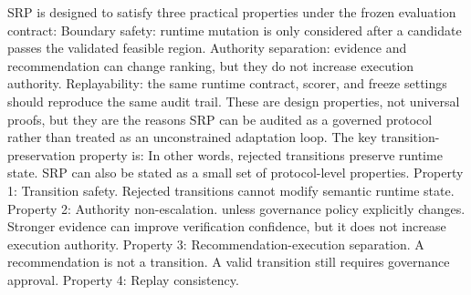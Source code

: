 {}SRP is designed to satisfy three practical properties under the frozen evaluation contract:\markdownRendererInterblockSeparator
{}\markdownRendererUlBeginTight
\markdownRendererUlItem Boundary safety: runtime mutation is only considered after a candidate passes the validated feasible region.\markdownRendererUlItemEnd 
\markdownRendererUlItem Authority separation: evidence and recommendation can change ranking, but they do not increase execution authority.\markdownRendererUlItemEnd 
\markdownRendererUlItem Replayability: the same runtime contract, scorer, and freeze settings should reproduce the same audit trail.\markdownRendererUlItemEnd 
\markdownRendererUlEndTight \markdownRendererInterblockSeparator
{}These are design properties, not universal proofs, but they are the reasons SRP can be audited as a governed protocol rather than treated as an unconstrained adaptation loop.\markdownRendererParagraphSeparator
{}The key transition-preservation property is:\markdownRendererInterblockSeparator
{}\markdownRendererInterblockSeparator
{}In other words, rejected transitions preserve runtime state.\markdownRendererInterblockSeparator
{}
\markdownRendererSectionEnd \markdownRendererSectionBegin
{}\markdownRendererInterblockSeparator
{}SRP can also be stated as a small set of protocol-level properties.\markdownRendererParagraphSeparator
{}Property 1: Transition safety.\markdownRendererInterblockSeparator
{}\markdownRendererInterblockSeparator
{}Rejected transitions cannot modify semantic runtime state.\markdownRendererParagraphSeparator
{}Property 2: Authority non-escalation.\markdownRendererInterblockSeparator
{}\markdownRendererInterblockSeparator
{}unless governance policy explicitly changes. Stronger evidence can improve verification confidence, but it does not increase execution authority.\markdownRendererParagraphSeparator
{}Property 3: Recommendation-execution separation.\markdownRendererInterblockSeparator
{}\markdownRendererInterblockSeparator
{}A recommendation is not a transition. A valid transition still requires governance approval.\markdownRendererParagraphSeparator
{}Property 4: Replay consistency.\markdownRendererInterblockSeparator
